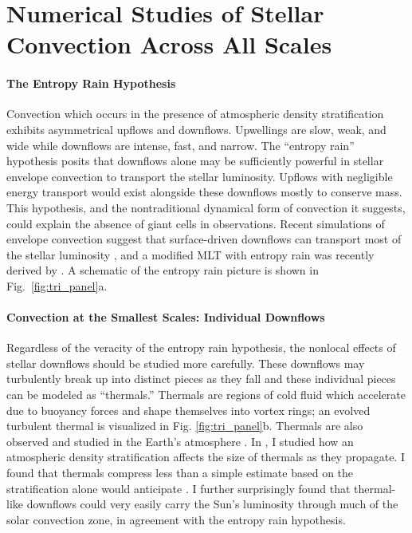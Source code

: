 \documentclass[preprint, hmargin=1in, vmargin=1in]{aastex62}
\begin{document}
\section*{\textbf{Numerical Studies of Stellar Convection Across All Scales}}
\paragraph{The Entropy Rain Hypothesis}
Convection which occurs in the presence of atmospheric density stratification exhibits asymmetrical upflows and downflows.
Upwellings are slow, weak, and wide while downflows are intense, fast, and narrow.
The ``entropy rain'' hypothesis \citep[][]{spruit1997} posits that downflows alone may be sufficiently powerful in stellar envelope convection to transport the stellar luminosity.
Upflows with negligible energy transport would exist alongside these downflows mostly to conserve mass.
This hypothesis, and the nontraditional dynamical form of convection it suggests, could explain the absence of giant cells in observations.
Recent simulations of envelope convection suggest that surface-driven downflows can transport most of the stellar luminosity \citep{kapyla&all2017}, and a modified MLT with entropy rain was recently derived by \citet{brandenburg2016}.
A schematic of the entropy rain picture is shown in Fig.~\ref{fig:tri_panel}a.


\paragraph{Convection at the Smallest Scales: Individual Downflows} 
Regardless of the veracity of the entropy rain hypothesis, the nonlocal effects of stellar downflows should be studied more carefully.
These downflows may turbulently break up into distinct pieces as they fall and these individual pieces can be modeled as ``thermals.''
Thermals are regions of cold fluid which accelerate due to buoyancy forces and shape themselves into vortex rings; an evolved turbulent thermal is visualized in Fig. \ref{fig:tri_panel}b.
Thermals are also observed and studied in the Earth's atmosphere \citep{lecoanet&jeevanjee2019}.
In \citet{andersLB2019}, I studied how an atmospheric density stratification affects the size of thermals as they propagate.
I found that thermals compress less than a simple estimate based on the stratification alone would anticipate \citep{brandenburg2016}.
I further surprisingly found that thermal-like downflows could very easily carry the Sun's luminosity through much of the solar convection zone, in agreement with the entropy rain hypothesis.
\end{document}
